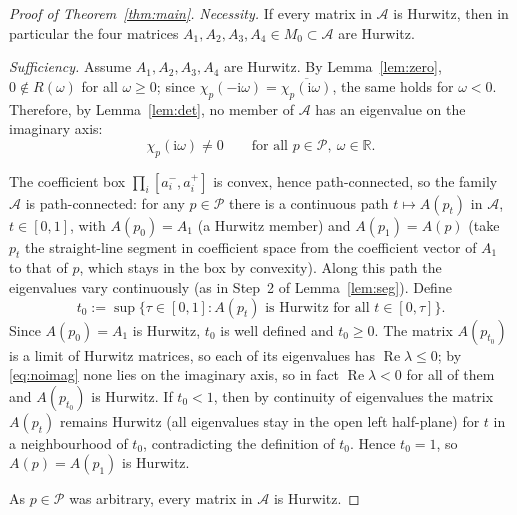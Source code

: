 \documentclass[12pt]{article}
\theoremstyle{definition}
\DeclareMathOperator{\Real}{Re}
\newcommand{\jj}{\mathrm{i}}
\begin{document}
\begin{proof}[Proof of Theorem~\ref{thm:main}]
\emph{Necessity.} If every matrix in $\mathcal A$ is Hurwitz, then in particular the four
matrices $A_1,A_2,A_3,A_4\in M_0\subset\mathcal A$ are Hurwitz.

\emph{Sufficiency.} Assume $A_1,A_2,A_3,A_4$ are Hurwitz. By Lemma~\ref{lem:zero},
$0\notin R(\omega)$ for all $\omega\ge0$; since $\chi_p(-\jj\omega)=\overline{\chi_p(\jj
\omega)}$, the same holds for $\omega<0$. Therefore, by Lemma~\ref{lem:det}, no member of
$\mathcal A$ has an eigenvalue on the imaginary axis:
\begin{equation}\label{eq:noimag}
\chi_p(\jj\omega)\ne0\qquad\text{for all }p\in\mathcal P,\ \omega\in\mathbb R .
\end{equation}

The coefficient box $\prod_i[a_i^-,a_i^+]$ is convex, hence path-connected, so the family
$\mathcal A$ is path-connected: for any $p\in\mathcal P$ there is a continuous path
$t\mapsto A(p_t)$ in $\mathcal A$, $t\in[0,1]$, with $A(p_0)=A_1$ (a Hurwitz member) and
$A(p_1)=A(p)$ (take $p_t$ the straight-line segment in coefficient space from the
coefficient vector of $A_1$ to that of $p$, which stays in the box by convexity). Along
this path the eigenvalues vary continuously (as in Step~2 of Lemma~\ref{lem:seg}). Define
\[
t_0:=\sup\{\tau\in[0,1]:A(p_t)\text{ is Hurwitz for all }t\in[0,\tau]\}.
\]
Since $A(p_0)=A_1$ is Hurwitz, $t_0$ is well defined and $t_0\ge0$. The matrix $A(p_{t_0})$
is a limit of Hurwitz matrices, so each of its eigenvalues has $\Real\lambda\le0$; by
\eqref{eq:noimag} none lies on the imaginary axis, so in fact $\Real\lambda<0$ for all of
them and $A(p_{t_0})$ is Hurwitz. If $t_0<1$, then by continuity of eigenvalues the matrix
$A(p_t)$ remains Hurwitz (all eigenvalues stay in the open left half-plane) for $t$ in a
neighbourhood of $t_0$, contradicting the definition of $t_0$. Hence $t_0=1$, so
$A(p)=A(p_1)$ is Hurwitz.

As $p\in\mathcal P$ was arbitrary, every matrix in $\mathcal A$ is Hurwitz.
\end{proof}
\end{document}
